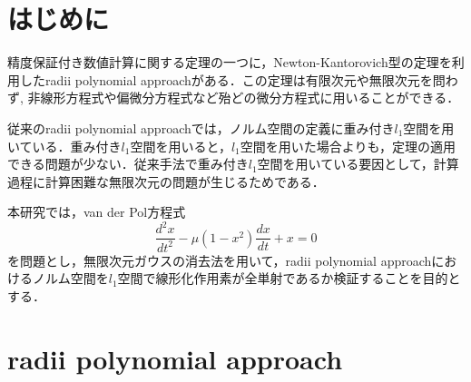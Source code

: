 \documentclass[a4paper,10pt,twocolumn]{jsarticle}
\title{\vspace{-8mm}{\Large \gtfamily\mdseries\upshape 無限次元ガウスの消去法を用いた \rad{}改良 }\vspace{-3mm}}
\date{}
\author{（指導教員 関根 晃太 准教授） \\ 関根研究室 2131701 齋藤 悠希
\vspace{-5mm}}
\newcommand{\rad}{radii polynomial approach}
\newcommand{\nk}{Newton-Kantorovich}
\newcommand{\vdp}{van der Pol方程式}
\begin{document}
\maketitle
\vspace{-10mm}



\section{はじめに}
\vspace{-1mm}
精度保証付き数値計算に関する定理の一つに，\nk{}型の定理を利用した\rad{}がある．この定理は有限次元や無限次元を問わず, 非線形方程式や偏微分方程式など殆どの微分方程式に用いることができる．

従来の\rad{}では，ノルム空間の定義に重み付き$l_1$空間を用いている．重み付き$l_1$空間を用いると，$l_1$空間を用いた場合よりも，定理の適用できる問題が少ない．従来手法で重み付き$l_1$空間を用いている要因として，計算過程に計算困難な無限次元の問題が生じるためである．

本研究では，\vdp{}
\begin{equation}
  \frac{d^2x}{dt^2} - \mu (1-x^2)\frac{dx}{dt}+x=0
\end{equation}
を問題とし，無限次元ガウスの消去法を用いて，\rad{}におけるノルム空間を$l_1$空間で線形化作用素が全単射であるか検証することを目的とする．



\vspace{-1mm}
\section{\rad{} \cite{github}}
\vspace{-1mm}
\end{document}

